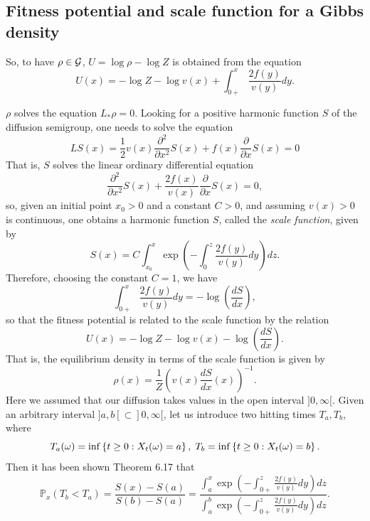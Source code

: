 \documentclass[12pt]{article}
\begin{document}
\subsection{Fitness potential and scale function for a Gibbs density}


So, to have $\rho\in\mathcal{G}$, $U=\log \rho-\log Z$ is obtained from the equation
\begin{equation}\label{Potential}
    U(x)=-\log Z-\log v(x)+\int_{0+}^x\frac{2f(y)}{v(y)}dy.
\end{equation}

$\rho$ solves the equation $L_*\rho=0$. Looking for a positive harmonic function $S$ of the diffusion semigroup, one needs to solve the equation 
\begin{equation}
    LS(x)=\frac{1}{2}v(x)\frac{\partial^2}{\partial x^2}S(x)+f(x)\frac{\partial}{\partial x}S(x)=0
\end{equation}
That is, $S$ solves the linear ordinary differential equation
\begin{equation}\label{ODE}
  \frac{\partial^2}{\partial x^2}S(x)+\frac{2f(x)}{v(x)}\frac{\partial}{\partial x}S(x)=0,  
\end{equation}
so, given an initial point $x_0>0$ and a constant $C>0$, and assuming $v(x)>0$ is continuous, one obtains a harmonic function $S$, called the \textit{scale function}, given by
\begin{equation}
   S(x)=C\int_{x_0}^x\exp\left(-\int_0^z\frac{2f (y)}{v(y)}dy\right)dz. 
\end{equation}
Therefore, choosing the constant $C=1$, we have
\[\int_{0+}^x\frac{2f(y)}{v(y)}dy=-\log (\frac{dS}{dx}),\]
so that the fitness potential is related to the scale function by the relation
\begin{equation}
    U(x)=-\log Z-\log v(x)-\log (\frac{dS}{dx}).
\end{equation}
That is, the equilibrium density in terms of the scale function is given by
\begin{equation}
    \rho (x)=\frac{1}{Z}\left(v(x)\frac{dS}{dx}(x)\right)^{-1}.
\end{equation}
Here we assumed that our diffusion takes values in the open interval $]0,\infty[$. Given an arbitrary interval $]a,b[\subset ]0,\infty[$, let us introduce two hitting times $T_a,T_b$, where
\[T_a(\omega)=\inf\left\{t\geq 0:X_t(\omega)=a\right\},\;T_b=\inf\left\{t\geq 0:X_t(\omega)=b\right\}.\]
Then it has been shown \citep{Klebaner2006} Theorem 6.17 that
\begin{equation}
    \mathbb{P}_x(T_b<T_a)=\frac{S(x)-S(a)}{S(b)-S(a)}=\frac{\int_a^x\exp\left(-\int_{0+}^z\frac{2f(y)}{v(y)}dy\right)dz}{\int_a^b\exp\left(-\int_{0+}^z\frac{2f(y)}{v(y)}dy\right)dz}.
\end{equation}
\end{document}
